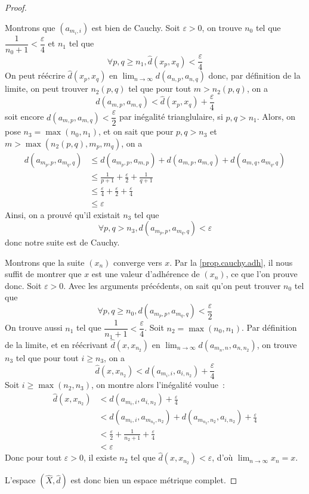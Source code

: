 \begin{proof}
\begin{itemize}
    Montrons que $(a_{m_i,i})$ est bien de Cauchy. Soit $\varepsilon > 0$, on
    trouve $n_0$ tel que $\dfrac{1}{n_0 + 1} < \dfrac{\varepsilon}{4}$ et $n_1$
    tel que
    \[\forall p,q \geq n_1, \hat d(x_p,x_q) < \frac{\varepsilon}{4}\]
    On peut réécrire $\hat d(x_p,x_q)$ en
    $\displaystyle\lim_{n \to \infty} d(a_{n,p}, a_{n,q})$ donc, par définition de
    la limite, on peut trouver $n_2(p,q)$ tel que pour tout $m > n_2(p,q)$, on a
    \[d(a_{m,p},a_{m,q}) < \hat d(x_p,x_q) + \frac{\varepsilon}{4}\]
    soit encore $d(a_{m,p},a_{m,q}) < \dfrac{\varepsilon}{2}$ par inégalité
    trianglulaire, si $p,q > n_1$. Alors, on pose $n_3 = \max(n_0,n_1)$, et on
    sait que pour $p,q > n_3$ et $m > \max(n_2(p,q), m_p,m_q)$, on a
    \begin{align*}
      d(a_{m_p,p},a_{m_q,q}) &\leq d(a_{m_p,p},a_{m,p}) + d(a_{m,p}, a_{m,q}) +
      d(a_{m,q},a_{m_q,q}) \\
      &\leq \frac{1}{p + 1} + \frac{\varepsilon}{2} + \frac{1}{q + 1}\\
      &\leq \frac{\varepsilon}{4} + \frac{\varepsilon}{2} +
      \frac{\varepsilon}{4}\\
      &\leq \varepsilon
    \end{align*}
    Ainsi, on a prouvé qu'il existait $n_3$ tel que
    \[\forall p,q > n_3, d(a_{m_p,p}, a_{m_q,q}) < \varepsilon\]
    donc notre suite est de Cauchy.

    Montrons que la suite $(x_n)$ converge vers $x$. Par la
    \cref{prop.cauchy.adh}, il nous suffit de montrer que $x$ est une valeur
    d'adhérence de $(x_n)$, ce que l'on prouve donc. Soit $\varepsilon > 0$.
    Avec les arguments précédents, on sait qu'on peut trouver $n_0$ tel que
    \[\forall p,q \geq n_0, d(a_{m_p,p},a_{m_q,q}) < \frac{\varepsilon}{2}\]
    On trouve aussi $n_1$ tel que
    $\dfrac{1}{n_1 + 1} < \dfrac{\varepsilon}{4}$. Soit $n_2 = \max(n_0,n_1)$.
    Par définition de la limite, et en réécrivant $\hat d(x,x_{n_2})$ en
    $\displaystyle\lim_{n\to\infty} d(a_{m_n,n},a_{n,n_2})$, on trouve $n_3$ tel que
    pour tout $i \geq n_3$, on a
    \[\hat d(x,x_{n_2}) < d(a_{m_i,i}, a_{i,n_2}) + \frac{\varepsilon}{4}\]
    Soit $i \geq \max(n_2,n_3)$, on montre alors l'inégalité voulue~:
    \begin{align*}
      \hat d(x,x_{n_2}) &< d(a_{m_i,i}, a_{i,n_2}) + \frac{\varepsilon}{4}\\
      &< d(a_{m_i,i}, a_{m_{n_2},n_2}) + d(a_{m_{n_2},n_2}, a_{i,n_2})
      + \frac{\varepsilon}{4}\\
      &< \frac{\varepsilon}{2} + \frac{1}{n_2 + 1} + \frac{\varepsilon}{4}\\
      &< \varepsilon
    \end{align*}
    Donc pour tout $\varepsilon > 0$, il existe $n_2$ tel que
    $\hat d(x,x_{n_2}) < \varepsilon$, d'où
    $\displaystyle\lim_{n \to \infty} x_n = x$.
  \end{itemize}
  L'espace $(\hat X,\hat d)$ est donc bien un espace métrique complet.
  

\end{proof}
